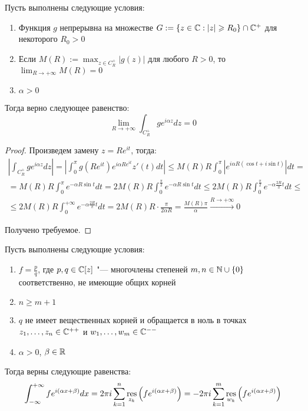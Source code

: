 \begin{proposition}
	Пусть выполнены следующие условия:
	\begin{enumerate}
		\item Функция $g$ непрерывна на множестве $G := \{z \in \mathbb{C} : |z| \geqslant R_0\} \cap \mathbb{C}^+$ для некоторого $R_0 > 0$
		\item Если $M(R) := \max_{z \in C_R^+}|g(z)|$ для любого $R>0$, то $\lim_{R \to +\infty}M(R) = 0$
		\item $\alpha > 0$
	\end{enumerate}
	
	Тогда верно следующее равенство:
	\[\lim_{R \to +\infty} \int_{C_R^+}ge^{i\alpha z}dz = 0\]
\end{proposition}

\begin{proof}
	Произведем замену $z = Re^{it}$, тогда:
	\begin{multline*}
		\left|\int_{C_R^+}ge^{i\alpha z}dz\right| = \left|\int_0^\pi g(Re^{it})e^{i\alpha Re^{it}}z'(t)dt\right| \le M(R)R \int_0^\pi \left|e^{i\alpha R(\cos{t} + i\sin{t})}\right|dt = \\
		= M(R)R \int_0^\pi e^{-\alpha R\sin{t}}dt = 2M(R)R \int_0^{\frac\pi 2} e^{-\alpha R\sin{t}}dt  \le 2M(R)R \int_0^{\frac\pi 2} e^{-\alpha \frac{2R}\pi t}dt \le \\
		\le 2M(R)R \int_0^{+\infty} e^{-\alpha \frac{2R}\pi t}dt = 2M(R)R \cdot \frac\pi{2\alpha R} = \frac{M(R)\pi}{\alpha} \xrightarrow{R \to +\infty} 0
	\end{multline*}
	
	Получено требуемое.
\end{proof}

\begin{theorem}
	Пусть выполнены следующие условия:
	\begin{enumerate}
		\item $f = \frac pq$, где $p, q \in \mathbb{C}[z]$ "--- многочлены степеней $m, n \in \mathbb{N} \cup \{0\}$ соответственно, не имеющие общих корней
		\item $n \ge m + 1$
		\item $q$ не имеет вещественных корней и обращается в ноль в точках $z_1, \dotsc, z_n \in \mathbb{C}^{++}$ и $w_1, \dotsc, w_m \in \mathbb{C}^{--}$
		\item $\alpha > 0$, $\beta \in \mathbb{R}$
	\end{enumerate}
	
	Тогда верны следующие равенства:
	\[\int_{-\infty}^{+\infty}fe^{i(\alpha x + \beta)}dx = 2\pi i\sum_{k=1}^n \operatorname*{res}_{z_k}\left(fe^{i(\alpha x + \beta)}\right) = -2\pi i\sum_{k=1}^m \operatorname*{res}_{w_k}\left(fe^{i(\alpha x + \beta)}\right)\]
\end{theorem}

